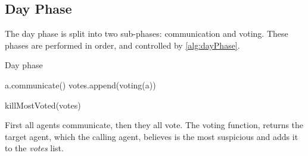 \subsection{Day Phase}\label{sec:dayPhase}
The day phase is split into two sub-phases: communication and voting. These
phases are performed in order, and controlled by \cref{alg:dayPhase}.
\begin{algorithm}[H]
	\caption{Day phase}
	\begin{algorithmic}[1]
		\State a.communicate()
		\EndFor
		\State votes.append(voting(a))
		\EndFor

		\State killMostVoted(votes)
		\EndFunction
	\end{algorithmic}\label{alg:dayPhase}
\end{algorithm}
\setcounter{algorithmcaption}{1}
First all agents communicate, then they all vote. The voting function, returns the target agent, which the calling agent, believes is the most suspicious and adds it to the \textit{votes} list.

